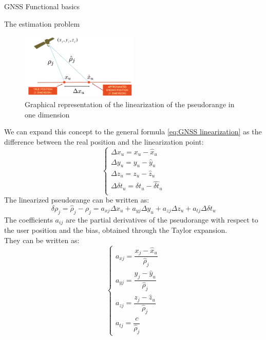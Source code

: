 \begin{section}{GNSS Functional basics}
\begin{subsection}{The estimation problem}
      \begin{figure}[h]
        \centering
        \includegraphics[width=0.5\textwidth]{img/wireless/linearization scenario.png}
        \caption{Graphical representation of the linearization of the pseudorange in one dimension}
        \label{fig:GNSS linearization}
      \end{figure}
      We can expand this concept to the general formula \ref{eq:GNSS linearization} as the difference 
      between the real position and the linearization point:
      \begin{equation}
        \begin{cases}
          \Delta x_u = x_u - \hat{x}_u\\
          \Delta y_u = y_u - \hat{y}_u\\
          \Delta z_u = z_u - \hat{z}_u\\
          \Delta \delta t_u = \delta t_u - \hat{\delta t}_u\\
        \end{cases}
        \label{eq:GNSS linearization difference}
      \end{equation}
      The linearized pseudorange can be written as:
      \begin{equation}
        \delta \rho_j = \hat{\rho}_j - \rho_j = a_{xj}\Delta x_u + a_{yj}\Delta y_u + a_{zj}\Delta z_u + a_{tj}\Delta \delta t_u
        \label{eq:GNSS linearized pseudorange}
      \end{equation}
      The coefficients $a_{ij}$ are the partial derivatives of the pseudorange with respect to the
      user position and the bias, obtained through the Taylor expansion.\\
      They can be written as:
      \begin{equation}
        \begin{cases}
          a_{xj} = \dfrac{x_j - \hat{x}_u}{\hat{\rho}_j}\\
          a_{yj} = \dfrac{y_j - \hat{y}_u}{\hat{\rho}_j}\\
          a_{zj} = \dfrac{z_j - \hat{z}_u}{\hat{\rho}_j}\\
          a_{tj} = \dfrac{c}{\hat{\rho}_j}

\end{cases}
\end{equation}
\end{subsection}
\end{section}
